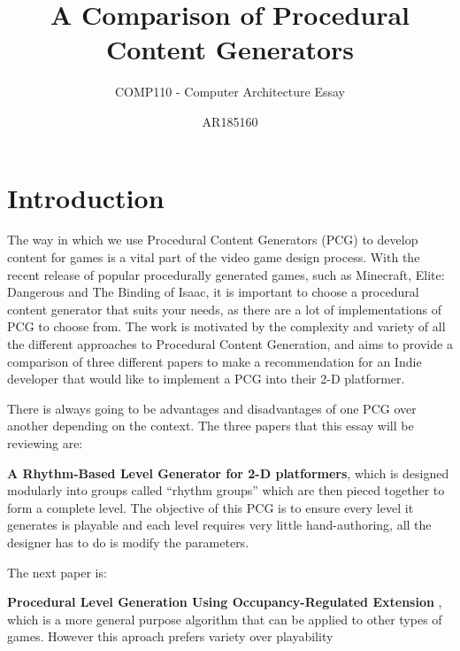 \documentclass{scrartcl}
\title{A Comparison of Procedural Content Generators}
\subtitle{COMP110 - Computer Architecture Essay}
\author{AR185160}
\begin{document}
\maketitle


\section{Introduction}

The way in which we use Procedural Content Generators (PCG) to develop content for games is a vital part of the video game design process. With the recent release of popular procedurally generated games, such as Minecraft, Elite: Dangerous and The Binding of Isaac, it is important to choose a procedural content generator that suits your needs, as there are a lot of implementations of PCG to choose from. The work is motivated by the complexity and variety of all the different approaches to Procedural Content Generation, and aims to provide a comparison of three different papers to make a recommendation for an Indie developer that would like to implement a PCG into their 2-D platformer.

There is always going to be advantages and disadvantages of one PCG over another depending on the context. The three papers that this essay will be reviewing are:

\textbf{A Rhythm-Based Level Generator for 2-D platformers}\cite{smith2009}, which is designed modularly into groups called ``rhythm groups'' which are then pieced together to form a complete level. The objective of this PCG is to ensure every level it generates is playable and each level requires very little hand-authoring, all the designer has to do is modify the parameters. 

The next paper is:

\textbf{Procedural Level Generation Using Occupancy-Regulated Extension} \cite{mawhorter2010}, which is a more general purpose algorithm that can be applied to other types of games. However this aproach prefers variety over playability
\end{document}

